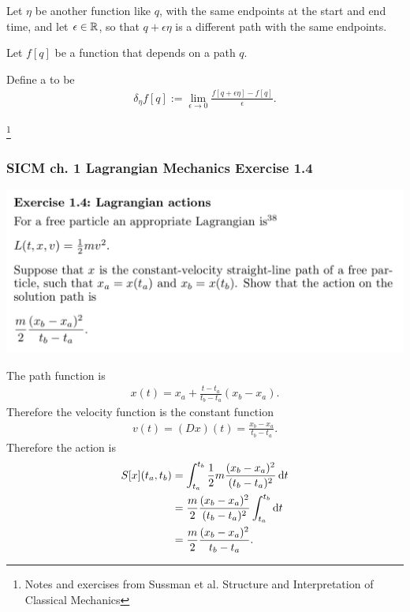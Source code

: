 Let $\eta$ be another function like $q$, with the same endpoints at the start and end time, and
let $\epsilon \in \mathbb{R}$, so that $q + \epsilon\eta$ is a different path with the same endpoints.


Let $f[q]$ be a function that depends on a path $q$.

Define a  to be
\begin{align*}
  \delta_{\eta}f[q] := \lim_{\epsilon \to 0} \frac{f[q + \epsilon\eta] - f[q]}{\epsilon}.
\end{align*}

\newpage
\footnote{Notes and exercises from Sussman et al. Structure and Interpretation of Classical Mechanics}
\subsubsection*{SICM ch. 1 Lagrangian Mechanics Exercise 1.4}
\begin{mdframed}
  \includegraphics[width=400pt]{img/physics--classical-mechanics--sicm--1-4.png}
\end{mdframed}
The path function is
\begin{align*}
  x(t) = x_a + \frac{t - t_a}{t_b - t_a}(x_b - x_a).
\end{align*}
Therefore the velocity function is the constant function
\begin{align*}
  v(t) = (D x)(t) = \frac{x_b - x_a}{t_b - t_a}.
\end{align*}
Therefore the action is
\begin{align*}
  S[x](t_a, t_b) &= \int_{t_a}^{t_b}  \frac{1}{2}m \frac{(x_b - x_a)^2}{(t_b - t_a)^2} \d t \\
                 &= \frac{m}{2} \frac{(x_b - x_a)^2}{(t_b - t_a)^2}\int_{t_a}^{t_b} \d t \\
                 &= \frac{m}{2} \frac{(x_b - x_a)^2}{t_b - t_a}.
\end{align*}

